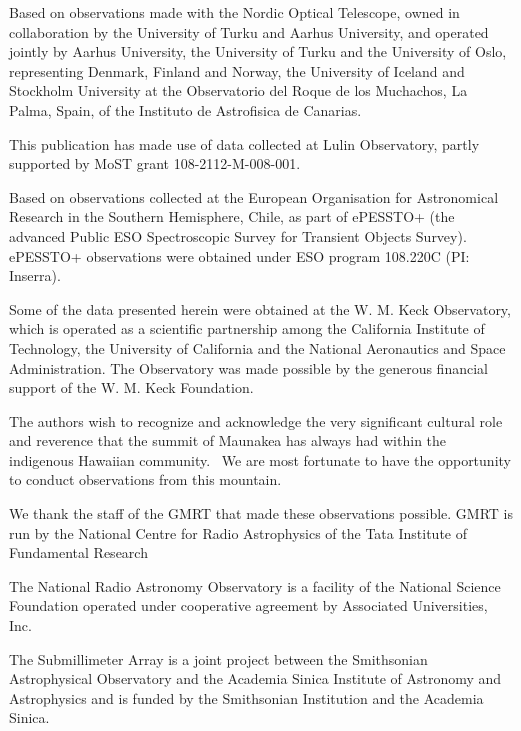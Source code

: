 \documentclass{nature_plusfigure}
\begin{document}
\begin{addendum}
Based on observations made with the Nordic Optical Telescope, owned in collaboration by the University of Turku and Aarhus University, and operated jointly by Aarhus University, the University of Turku and the University of Oslo, representing Denmark, Finland and Norway, the University of Iceland and Stockholm University at the Observatorio del Roque de los Muchachos, La Palma, Spain, of the Instituto de Astrofisica de Canarias.

This publication has made use of data collected at Lulin Observatory, partly supported by MoST grant 108-2112-M-008-001.

Based on observations collected at the European Organisation for Astronomical Research in the Southern Hemisphere, Chile, as part of ePESSTO+ (the advanced Public ESO Spectroscopic Survey for Transient Objects Survey).
ePESSTO+ observations were obtained under ESO program 108.220C (PI: Inserra).


Some of the data presented herein were obtained at the W. M. Keck Observatory, which is operated as a scientific partnership among the California Institute of Technology, the University of California and the National Aeronautics and Space Administration. The Observatory was made possible by the generous financial support of the W. M. Keck Foundation.

The authors wish to recognize and acknowledge the very significant cultural role and reverence that the summit of Maunakea has always had within the indigenous Hawaiian community.  We are most fortunate to have the opportunity to conduct observations from this mountain.

We thank the staff of the GMRT that made these observations possible. GMRT is run by the National Centre for Radio Astrophysics of the Tata Institute of Fundamental Research

The National Radio Astronomy Observatory is a facility of the National Science Foundation operated under cooperative agreement by Associated Universities, Inc.

The Submillimeter Array is a joint project between the Smithsonian Astrophysical Observatory and the Academia Sinica Institute of Astronomy and Astrophysics and is funded by the Smithsonian Institution and the Academia Sinica.


\end{addendum}
\end{document}
